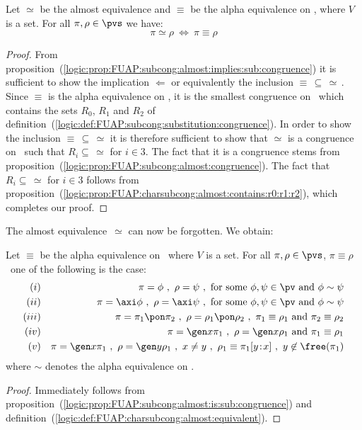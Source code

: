 \begin{prop}\label{logic:prop:FUAP:subcong:almost:is:sub:congruence}
Let $\simeq$ be the almost equivalence and $\equiv$ be the
alpha equivalence on \pvs, where $V$ is a set. For all
$\pi,\rho\in\pvs$ we have:
    \[
    \pi\simeq\rho\ \Leftrightarrow\ \pi\equiv\rho
    \]
\end{prop}
\begin{proof}
From
proposition~(\ref{logic:prop:FUAP:subcong:almost:implies:sub:congruence})
it is sufficient to show the implication $\Leftarrow$ or
equivalently the inclusion $\equiv\,\subseteq\,\simeq\,$. Since
$\equiv$ is the alpha equivalence on \pvs, it is the smallest
congruence on \pvs\ which contains the sets $R_{0}$, $R_{1}$ and
$R_{2}$ of
definition~(\ref{logic:def:FUAP:subcong:substitution:congruence}).
In order to show the inclusion $\equiv\,\subseteq\,\simeq$ it is
therefore sufficient to show that $\simeq$ is a congruence on \pvs\
such that $R_{i}\subseteq\,\simeq$ for $i\in 3$. The fact that it is
a congruence stems from
proposition~(\ref{logic:prop:FUAP:subcong:almost:congruence}). The
fact that $R_{i}\subseteq\,\simeq$ for $i\in 3$  follows from
proposition~(\ref{logic:prop:FUAP:charsubcong:almost:contains:r0:r1:r2}),
which completes our proof.
\end{proof}

The almost equivalence~$\simeq$ can now be forgotten. We obtain:

\begin{theorem}\label{logic:the:FUAP:charsubcong:charac}
Let $\equiv$ be the alpha equivalence on \pvs\ where $V$ is a
set. For all $\pi,\rho\in\pvs$, $\pi\equiv\rho$ \ifand\ one of the
following is the case:
    \begin{eqnarray*}
    (i)&&\pi=\phi\ ,\ \rho=\psi\ ,\ \mbox{for some}\ \phi,\psi\in\pv\ \mbox{and}\ \phi\sim\psi\\
    (ii)&&\pi=\axi\phi\ ,\ \rho=\axi\psi\ ,\ \mbox{for some}\ \phi,\psi\in\pv\ \mbox{and}\ \phi\sim\psi\\
    (iii)&&\pi=\pi_{1}\pon\pi_{2}\ ,\ \rho=\rho_{1}\pon\rho_{2}\ ,\
    \pi_{1}\equiv\rho_{1}\ \mbox{and}\ \pi_{2}\equiv\rho_{2}\\
    (iv)&&\pi=\gen x\pi_{1}\ ,\ \rho=\gen x\rho_{1}\ \mbox{and}\ \pi_{1}\equiv\rho_{1}\\
    (v)&&\pi=\gen x\pi_{1}\ ,\ \rho=\gen y\rho_{1}\ ,\ x\neq y\ ,\
    \rho_{1}\equiv \pi_{1}[y\!:\!x]\ ,\ y\not\in\free(\pi_{1})
    \end{eqnarray*}
where $\sim$ denotes the alpha equivalence on \pv.
\end{theorem}
\begin{proof}
Immediately follows from
proposition~(\ref{logic:prop:FUAP:subcong:almost:is:sub:congruence})
and definition~(\ref{logic:def:FUAP:charsubcong:almost:equivalent}).
\end{proof}

